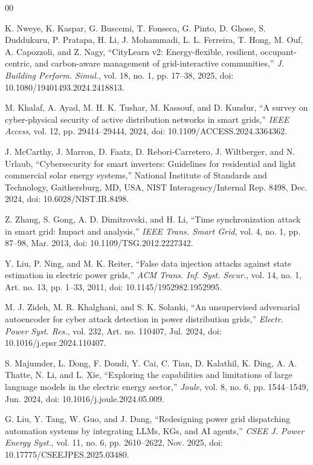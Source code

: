 \documentclass[conference]{IEEEtran}
\begin{document}
\begin{thebibliography}{00}

K. Nweye, K. Kaspar, G. Buscemi, T. Fonseca, G. Pinto, D. Ghose,
S. Duddukuru, P. Pratapa, H. Li, J. Mohammadi, L. L. Ferreira,
T. Hong, M. Ouf, A. Capozzoli, and Z. Nagy,
``CityLearn v2: Energy-flexible, resilient, occupant-centric, and
carbon-aware management of grid-interactive communities,''
\emph{J. Building Perform. Simul.}, vol. 18, no. 1, pp. 17--38,
2025, doi: 10.1080/19401493.2024.2418813.

M. Khalaf, A. Ayad, M. H. K. Tushar, M. Kassouf, and D. Kundur,
``A survey on cyber-physical security of active distribution networks
in smart grids,'' \emph{IEEE Access}, vol. 12, pp. 29414--29444,
2024, doi: 10.1109/ACCESS.2024.3364362.

J. McCarthy, J. Marron, D. Faatz, D. Rebori-Carretero,
J. Wiltberger, and N. Urlaub,
``Cybersecurity for smart inverters: Guidelines for residential and
light commercial solar energy systems,'' National Institute of
Standards and Technology, Gaithersburg, MD, USA,
NIST Interagency/Internal Rep. 8498, Dec. 2024,
doi: 10.6028/NIST.IR.8498.

Z. Zhang, S. Gong, A. D. Dimitrovski, and H. Li,
``Time synchronization attack in smart grid: Impact and analysis,''
\emph{IEEE Trans. Smart Grid}, vol. 4, no. 1, pp. 87--98,
Mar. 2013, doi: 10.1109/TSG.2012.2227342.

Y. Liu, P. Ning, and M. K. Reiter,
``False data injection attacks against state estimation in electric
power grids,'' \emph{ACM Trans. Inf. Syst. Secur.}, vol. 14, no. 1,
Art. no. 13, pp. 1--33, 2011,
doi: 10.1145/1952982.1952995.

M. J. Zideh, M. R. Khalghani, and S. K. Solanki,
``An unsupervised adversarial autoencoder for cyber attack detection
in power distribution grids,'' \emph{Electr. Power Syst. Res.},
vol. 232, Art. no. 110407, Jul. 2024,
doi: 10.1016/j.epsr.2024.110407.

S. Majumder, L. Dong, F. Doudi, Y. Cai, C. Tian, D. Kalathil,
K. Ding, A. A. Thatte, N. Li, and L. Xie,
``Exploring the capabilities and limitations of large language models
in the electric energy sector,'' \emph{Joule}, vol. 8, no. 6,
pp. 1544--1549, Jun. 2024,
doi: 10.1016/j.joule.2024.05.009.

G. Liu, Y. Tang, W. Guo, and J. Dang,
``Redesigning power grid dispatching automation systems by integrating
LLMs, KGs, and AI agents,'' \emph{CSEE J. Power Energy Syst.},
vol. 11, no. 6, pp. 2610--2622, Nov. 2025,
doi: 10.17775/CSEEJPES.2025.03480.


\end{thebibliography}
\end{document}
